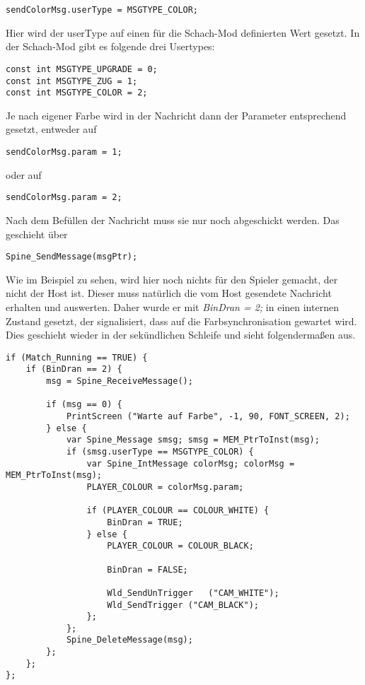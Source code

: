 \documentclass{article}
\begin{document}
\begin{lstlisting}
sendColorMsg.userType = MSGTYPE_COLOR;
\end{lstlisting}

Hier wird der userType auf einen für die Schach-Mod definierten Wert gesetzt. In der Schach-Mod gibt es folgende drei Usertypes:

\begin{lstlisting}
const int MSGTYPE_UPGRADE = 0;
const int MSGTYPE_ZUG = 1;
const int MSGTYPE_COLOR = 2;
\end{lstlisting}

Je nach eigener Farbe wird in der Nachricht dann der Parameter entsprechend gesetzt, entweder auf

\begin{lstlisting}
sendColorMsg.param = 1;
\end{lstlisting}

oder auf

\begin{lstlisting}
sendColorMsg.param = 2;
\end{lstlisting}

Nach dem Befüllen der Nachricht muss sie nur noch abgeschickt werden. Das geschieht über

\begin{lstlisting}
Spine_SendMessage(msgPtr);
\end{lstlisting}

Wie im Beispiel zu sehen, wird hier noch nichts für den Spieler gemacht, der nicht der Host ist. Dieser muss natürlich die vom Host gesendete Nachricht erhalten und auswerten. Daher wurde er mit \textit{BinDran = 2;} in einen internen Zustand gesetzt, der signalisiert, dass auf die Farbsynchronisation gewartet wird. Dies geschieht wieder in der sekündlichen Schleife und sieht folgendermaßen aus.

\begin{lstlisting}
if (Match_Running == TRUE) {
	if (BinDran == 2) {
		msg = Spine_ReceiveMessage();

		if (msg == 0) {
			PrintScreen	("Warte auf Farbe", -1, 90, FONT_SCREEN, 2);
		} else {
			var Spine_Message smsg; smsg = MEM_PtrToInst(msg);
			if (smsg.userType == MSGTYPE_COLOR) {
				var Spine_IntMessage colorMsg; colorMsg = MEM_PtrToInst(msg);
				PLAYER_COLOUR = colorMsg.param;

				if (PLAYER_COLOUR == COLOUR_WHITE) {
					BinDran = TRUE;
				} else {
					PLAYER_COLOUR = COLOUR_BLACK;

					BinDran = FALSE;

					Wld_SendUnTrigger	("CAM_WHITE");
					Wld_SendTrigger	("CAM_BLACK");
				};
			};
			Spine_DeleteMessage(msg);
		};
	};
};
\end{lstlisting}
\end{document}

